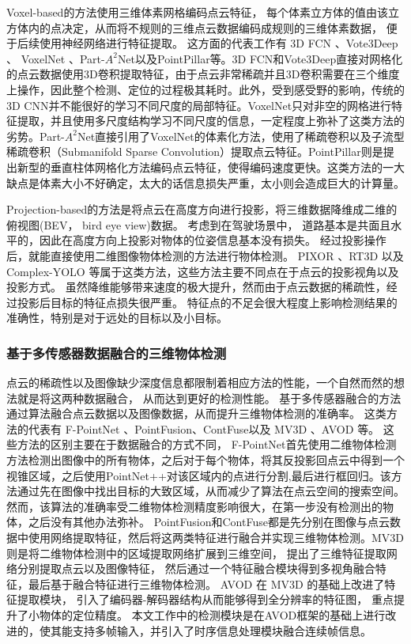 Voxel-based的方法使用三维体素网格编码点云特征， 每个体素立方体的值由该立方体内的点决定，从而将不规则的三维点云数据编码成规则的三维体素数据， 便于后续使用神经网络进行特征提取。 这方面的代表工作有 3D FCN \cite{li20173d}、Vote3Deep \cite{engelcke2017vote3deep}、 VoxelNet \cite{zhou2018voxelnet}、Part-$A^2$Net\cite{shi2020part}以及PointPillar\cite{lang2018pointpillars}等。3D FCN和Vote3Deep直接对网格化的点云数据使用3D卷积提取特征，由于点云非常稀疏并且3D卷积需要在三个维度上操作，因此整个检测、定位的过程极其耗时。此外，受到感受野的影响，传统的3D CNN并不能很好的学习不同尺度的局部特征。VoxelNet只对非空的网格进行特征提取，并且使用多尺度结构学习不同尺度的信息，一定程度上弥补了这类方法的劣势。Part-$A^2$Net直接引用了VoxelNet的体素化方法，使用了稀疏卷积以及子流型稀疏卷积（Submanifold Sparse Convolution\cite{Graham3D}）提取点云特征。PointPillar则是提出新型的垂直柱体网格化方法编码点云特征，使得编码速度更快。这类方法的一大缺点是体素大小不好确定，太大的话信息损失严重，太小则会造成巨大的计算量。 

Projection-based的方法是将点云在高度方向进行投影，将三维数据降维成二维的俯视图(BEV， bird eye view)数据。 考虑到在驾驶场景中， 道路基本是共面且水平的，因此在高度方向上投影对物体的位姿信息基本没有损失。 经过投影操作后，就能直接使用二维图像物体检测的方法进行物体检测。 PIXOR \cite{yang2018pixor}、RT3D\cite{8403277} 以及 Complex-YOLO \cite{simon2018complex,Simon_2019_CVPR_Workshops} 等属于这类方法，这些方法主要不同点在于点云的投影视角以及投影方式。 虽然降维能够带来速度的极大提升，然而由于点云数据的稀疏性，经过投影后目标的特征点损失很严重。 特征点的不足会很大程度上影响检测结果的准确性，特别是对于远处的目标以及小目标。

\subsubsection{基于多传感器数据融合的三维物体检测}

点云的稀疏性以及图像缺少深度信息都限制着相应方法的性能，一个自然而然的想法就是将这两种数据融合， 从而达到更好的检测性能。 基于多传感器融合的方法通过算法融合点云数据以及图像数据，从而提升三维物体检测的准确率。 这类方法的代表有 F-PointNet \cite{qi2018frustum}、PointFusion\cite{XuPointFusion}、ContFuse\cite{Ming2018Deep}以及 MV3D \cite{chen2017multi}、AVOD \cite{ku2018joint}等。 这些方法的区别主要在于数据融合的方式不同， F-PointNet首先使用二维物体检测方法检测出图像中的所有物体，之后对于每个物体，将其反投影回点云中得到一个视锥区域，之后使用PointNet++\cite{qi2017pointnet++}对该区域内的点进行分割,最后进行框回归。该方法通过先在图像中找出目标的大致区域，从而减少了算法在点云空间的搜索空间。然而，该算法的准确率受二维物体检测精度影响很大，在第一步没有检测出的物体，之后没有其他办法弥补。 PointFusion和ContFuse都是先分别在图像与点云数据中使用网络提取特征，然后将这两类特征进行融合并实现三维物体检测。MV3D 则是将二维物体检测中的区域提取网络扩展到三维空间， 提出了三维特征提取网络分别提取点云以及图像特征， 然后通过一个特征融合模块得到多视角融合特征，最后基于融合特征进行三维物体检测。 AVOD 在 MV3D 的基础上改进了特征提取模块， 引入了编码器-解码器结构从而能够得到全分辨率的特征图， 重点提升了小物体的定位精度。 本文工作中的检测模块是在AVOD框架的基础上进行改进的，使其能支持多帧输入，并引入了时序信息处理模块融合连续帧信息。


